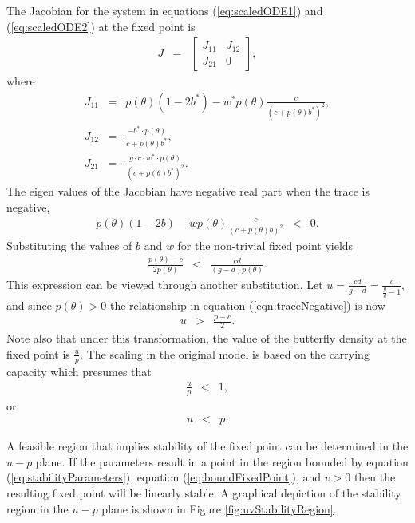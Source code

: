 \documentclass[12pt]{article}
\begin{document}
The Jacobian for the system in equations (\ref{eq:scaledODE1}) and
(\ref{eq:scaledODE2}) at the fixed point is
\begin{eqnarray}
  J & = &
          \left[
          \begin{array}{rr}
            J_{11} & J_{12} \\
            J_{21} & 0
          \end{array}
          \right],
\end{eqnarray}
where
\begin{eqnarray}
  \label{eq:jacobian}
  J_{11} & = & p(\theta)(1-2b^*) - w^* p(\theta)\frac{c}{(c+p(\theta)b^*)^2}, \\
  J_{12} & = & \frac{-b^*\cdot p(\theta)}{c+p(\theta)b^*}, \\
  J_{21} & = & \frac{g\cdot c \cdot w^* \cdot p(\theta)}{(c+p(\theta)b^*)^2}.
\end{eqnarray}
The eigen values of the Jacobian have negative real part when the
trace is negative,
\begin{eqnarray}
  p(\theta)(1-2b) - w p(\theta)\frac{c}{(c+p(\theta)b)^2} & < & 0.
\end{eqnarray}
Substituting the values of $b$ and $w$ for the non-trivial fixed point
yields
\begin{eqnarray}
  \label{eqn:traceNegative}
  \frac{p(\theta)-c}{2p(\theta)} & < & \frac{cd}{(g-d)p(\theta)}.
\end{eqnarray}
This expression can be viewed through another substitution. Let
$u=\frac{cd}{g-d}=\frac{c}{\frac{g}{d}-1}$, and since
$p(\theta)>0$ the relationship in equation
(\ref{eqn:traceNegative}) is now
\begin{eqnarray}
  \label{eq:stabilityParameters}
  u & > & \frac{p-c}{2}.
\end{eqnarray}
Note also that under this transformation, the value of the butterfly
density at the fixed point is $\frac{u}{p}$. The scaling in the
original model is based on the carrying capacity which presumes that
\begin{eqnarray}
  \frac{u}{p} & < & 1,
\end{eqnarray}
or 
\begin{eqnarray}
  \label{eq:boundFixedPoint}
  u & < & p.
\end{eqnarray}

A feasible region that implies stability of the fixed point can be
determined in the $u-p$ plane. If the parameters result in a point in
the region bounded by equation (\ref{eq:stabilityParameters}),
equation (\ref{eq:boundFixedPoint}), and $v>0$ then the resulting
fixed point will be linearly stable. A graphical depiction of the
stability region in the $u-p$ plane is shown in Figure
\ref{fig:uvStabilityRegion}.
\end{document}
